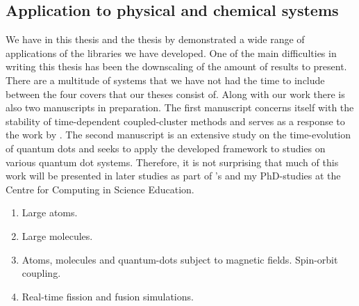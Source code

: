         \subsection{Application to physical and chemical systems}
            We have in this thesis and the thesis by \citeauthor{greg-winther}
            \cite{greg-winther} demonstrated a wide range of applications of the
            libraries we have developed.
            One of the main difficulties in writing this thesis has been the
            downscaling of the amount of results to present.
            There are a multitude of systems that we have not had the time to
            include between the four covers that our theses consist of.
            Along with our work there is also two manuscripts in preparation.
            The first manuscript concerns itself with the stability of
            time-dependent coupled-cluster methods \cite{oa-stability} and
            serves as a response to the work by
            \citeauthor{pedersen2018symplectic} \cite{pedersen2018symplectic}.
            The second manuscript is an extensive study on the time-evolution of
            quantum dots \cite{td-quantum-dots} and seeks to apply the developed
            framework to studies on various quantum dot systems.
            Therefore, it is not surprising that much of this work will be
            presented in later studies as part of \citeauthor{greg-winther}'s
            and my PhD-studies at the Centre for Computing in Science Education.

            \begin{enumerate}
                \item Large atoms.
                \item Large molecules.
                \item Atoms, molecules and quantum-dots subject to magnetic
                    fields. Spin-orbit coupling.
                \item Real-time fission and fusion simulations.
            \end{enumerate}
